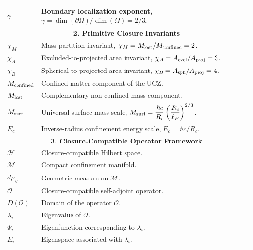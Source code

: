 \documentclass[11pt]{article}
\theoremstyle{definition}
\theoremstyle{remark}
\begin{document}
\begin{longtable}{p{}p{}}
$\gamma$ & Boundary localization exponent, $\gamma=\dim(\partial\Omega)/\dim(\Omega)=2/3$. \\

\hline
\multicolumn{2}{c}{\textbf{2. Primitive Closure Invariants}} \\
\hline

$\chi_M$ & Mass-partition invariant, $\chi_M=M_{\rm lost}/M_{\rm confined}=2$. \\

$\chi_A$ & Excluded-to-projected area invariant, $\chi_A=A_{\rm excl}/A_{\rm proj}=3$. \\

$\chi_B$ & Spherical-to-projected area invariant, $\chi_B=A_{\rm sph}/A_{\rm proj}=4$. \\

$M_{\rm confined}$ & Confined matter component of the UCZ. \\

$M_{\rm lost}$ & Complementary non-confined mass component. \\

$M_{\rm surf}$ & Universal surface mass scale, $M_{\rm surf}=\dfrac{\hbar c}{R_c}\left(\dfrac{R_c}{\ell_P}\right)^{2/3}$. \\

$E_c$ & Inverse-radius confinement energy scale, $E_c=\hbar c/R_c$. \\

\hline
\multicolumn{2}{c}{\textbf{3. Closure-Compatible Operator Framework}} \\
\hline

$\mathcal H$ & Closure-compatible Hilbert space. \\

$\mathcal M$ & Compact confinement manifold. \\

$d\mu_g$ & Geometric measure on $\mathcal M$. \\

$\mathcal O$ & Closure-compatible self-adjoint operator. \\

$D(\mathcal O)$ & Domain of the operator $\mathcal O$. \\

$\lambda_i$ & Eigenvalue of $\mathcal O$. \\

$\Psi_i$ & Eigenfunction corresponding to $\lambda_i$. \\

$E_i$ & Eigenspace associated with $\lambda_i$. \\


\end{longtable}
\end{document}

